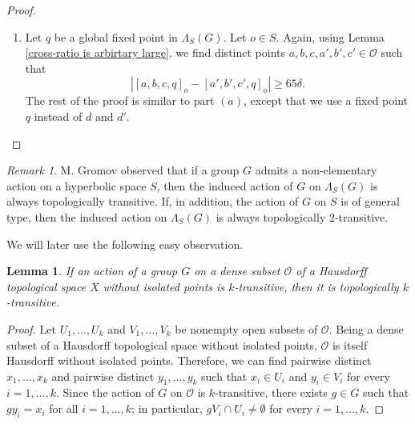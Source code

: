 \documentclass[11pt,letterpaper]{article}
\newtheorem{lem}[thm]{Lemma}
\theoremstyle{definition}
\theoremstyle{remark}
\newtheorem{rem}[thm]{Remark}
\begin{document}
\begin{proof}
\begin{enumerate}
$$
\begin{aligned}
&65\delta \leq \left|[a, b, c, d]_o - [a', b', c', d']_o\right| \leq \left|[a, b, c, d]_o - [\widehat{a}, \widehat{b}, \widehat{c}, \widehat{d}]_o\right|+\left|[\widehat{a}, \widehat{b}, \widehat{c}, \widehat{d}]_o-[a', b', c', d']_o\right| \leq \\
& \leq \left|[a, b, c, d]_o - [g\widehat{a}, g\widehat{b}, g\widehat{c}, g\widehat{d}]_{o}\right|+\left|[g\widehat{a}, g\widehat{b}, g\widehat{c}, g\widehat{d}]_{o}-[g\widehat{a}, g\widehat{b}, g\widehat{c}, g\widehat{d}]_{go}\right| +\\
&+ \left|[\widehat{a}, \widehat{b}, \widehat{c}, \widehat{d}]_o-[a', b', c', d']_o\right|\leq 64\delta,
\end{aligned}
$$ which is a contradiction.
\item[(b)] Let $q$ be a global fixed point in $\Lambda_S(G)$. Let $o\in S$. Again, using Lemma \ref{cross-ratio is arbirtary large}, we find distinct points $a, b, c, a', b', c' \in \mathcal{O}$ such that
$$\left|[a,b,c,q]_o - [a',b',c',q]_o\right| \geq 65\delta.$$ The rest of the proof is similar to part $(a)$, except that we use a fixed point $q$ instead of $d$ and $d'$.\end{enumerate} \end{proof}

\begin{rem}
M. Gromov \cite[8.2.H]{Gro87} observed that if a group $G$ admits a non-elementary action on a hyperbolic space $S$, then the induced action of $G$ on $\Lambda_S(G)$ is always topologically transitive. If, in addition, the action of $G$ on $S$ is of general type, then the induced action on $\Lambda_S(G)$ is always topologically $2$-transitive.
\end{rem}

We will later use the following easy observation.
 
\begin{lem}\label{transitivity and topological transitivity}
If an action of a group $G$ on a dense subset $\mathcal{O}$ of a Hausdorff topological space $X$ without isolated points is $k$-transitive, then it is topologically $k$-transitive.
\end{lem}
\begin{proof}
Let $U_1, \dots, U_k$ and $V_1, \dots, V_k$ be nonempty open subsets of $\mathcal{O}$. Being a dense subset of a Hausdorff topological space without isolated points, $\mathcal{O}$ is itself Hausdorff without isolated points. Therefore, we can find pairwise distinct $x_1, \dots, x_k$ and pairwise distinct $y_1, \dots, y_k $ such that $x_i \in U_i$ and $y_i \in V_i$ for every $i=1, \dots, k$. Since the action of $G$ on $\mathcal{O}$ is $k$-transitive, there exists $g \in G$ such that $gy_i=x_i$ for all $i=1, \dots, k$; in particular, $gV_i \cap U_i \neq \emptyset$ for every $i=1, \dots, k$.
\end{proof}
\end{document}

